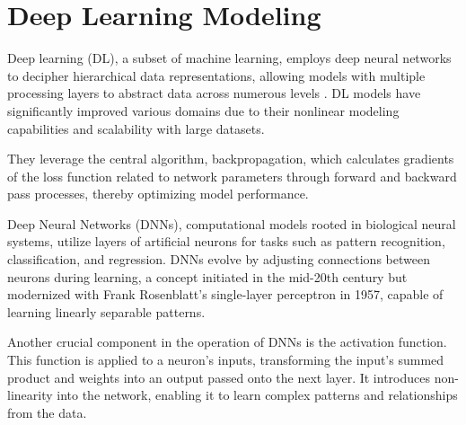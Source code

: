 \section{Deep Learning Modeling}

Deep learning (DL), a subset of machine learning, employs deep neural networks to decipher hierarchical data representations, allowing models with multiple processing layers to abstract data across numerous levels \cite{LeCun2015DeepLearning}. DL models have significantly improved various domains due to their nonlinear modeling capabilities and scalability with large datasets.

They leverage the central algorithm, backpropagation, which calculates gradients of the loss function related to network parameters through forward and backward pass processes, thereby optimizing model performance.



Deep Neural Networks (DNNs), computational models rooted in biological neural systems, utilize layers of artificial neurons for tasks such as pattern recognition, classification, and regression. DNNs evolve by adjusting connections between neurons during learning, a concept initiated in the mid-20th century but modernized with Frank Rosenblatt's single-layer perceptron in 1957, capable of learning linearly separable patterns.



Another crucial component in the operation of DNNs is the activation function. This function is applied to a neuron's inputs, transforming the input's summed product and weights into an output passed onto the next layer. It introduces non-linearity into the network, enabling it to learn complex patterns and relationships from the data.





\newpage